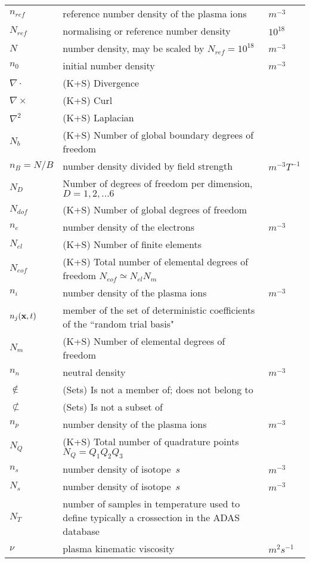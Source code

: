 \begin{longtable}{|p{3.0cm}|p{10.0cm}|p{3.0cm}|}
$n_{ref}$ & reference number density of the plasma ions & $m^{-3}$ \\
$N_{ref} $ & normalising or reference number density & $10^{18}$  \\
$N$ & number density, may be scaled by $N_{ref}=10^{18}$ & $m^{-3}$ \\
$n_0$ & initial number density & $m^{-3}$ \\
$\nabla \cdot$ &  (K+S) Divergence & \\
$\nabla \times$ &  (K+S) Curl & \\
$\nabla^2$ &  (K+S) Laplacian & \\
$N_{b}$ &  (K+S) Number of global boundary degrees of freedom & \\
$n_B=N/B$ & number density divided by field strength & $m^{-3}T^{-1}$ \\
$N_D$ &  Number of degrees of freedom per dimension, $D=1,2,\ldots6$ & \\
$N_{dof}$ &  (K+S) Number of global degrees of freedom & \\
$n_e$ & number density of the electrons & $m^{-3}$ \\
$N_{el}$ &  (K+S) Number of finite elements & \\
$N_{eof}$ &  (K+S) Total number of elemental degrees of freedom $N_{eof} \simeq N_{el}N_m$ & \\
$n_i$ & number density of the plasma ions & $m^{-3}$ \\
$n_j({\bf x},t)$ & member of the set of deterministic coefficients of the ``random trial basis" & \\
$N_{m}$ &  (K+S) Number of elemental degrees of freedom & \\
$n_n$ & neutral density & $m^{-3}$ \\
$\notin$ &  (Sets) Is not a member of; does not belong to & \\
$\not\subset$ &  (Sets) Is not a subset of & \\
$n_p$ & number density of the plasma ions & $m^{-3}$ \\
$N_{Q}$ &  (K+S) Total number of quadrature points $N_Q = Q_1 Q_2 Q_3$ & \\
$n_s$ & number density of isotope~$s$ & $m^{-3}$ \\
$N_s$ & number density of isotope~$s$ & $m^{-3}$ \\
$N_T$ & number of samples in temperature used to define typically a crossection in the ADAS database~\cite{adaswebsite,openadaswebsite} & \\
$\nu$ & plasma kinematic viscosity & $m^2 s^{-1}$ \\

\end{longtable}
